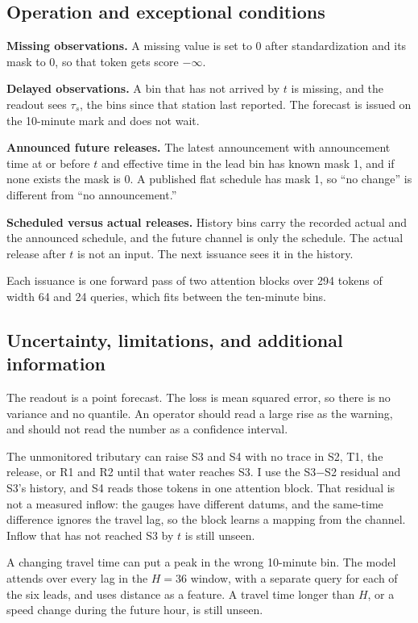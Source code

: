 \documentclass[11pt,a4paper]{article}
\begin{document}
\subsection{Operation and exceptional conditions}

\textbf{Missing observations.} A missing value is set to 0 after standardization and its mask to 0, so that token gets score \(-\infty\).

\textbf{Delayed observations.} A bin that has not arrived by \(t\) is missing, and the readout sees \(\tau_s\), the bins since that station last reported. The forecast is issued on the 10-minute mark and does not wait.

\textbf{Announced future releases.} The latest announcement with announcement time at or before \(t\) and effective time in the lead bin has known mask 1, and if none exists the mask is 0. A published flat schedule has mask 1, so ``no change'' is different from ``no announcement.''

\textbf{Scheduled versus actual releases.} History bins carry the recorded actual and the announced schedule, and the future channel is only the schedule. The actual release after \(t\) is not an input. The next issuance sees it in the history.

Each issuance is one forward pass of two attention blocks over 294 tokens of width 64 and 24 queries, which fits between the ten-minute bins.

\subsection{Uncertainty, limitations, and additional information}

The readout is a point forecast. The loss is mean squared error, so there is no variance and no quantile. An operator should read a large rise as the warning, and should not read the number as a confidence interval.

The unmonitored tributary can raise S3 and S4 with no trace in S2, T1, the release, or R1 and R2 until that water reaches S3. I use the S3$-$S2 residual and S3's history, and S4 reads those tokens in one attention block. That residual is not a measured inflow: the gauges have different datums, and the same-time difference ignores the travel lag, so the block learns a mapping from the channel. Inflow that has not reached S3 by \(t\) is still unseen.

A changing travel time can put a peak in the wrong 10-minute bin. The model attends over every lag in the \(H=36\) window, with a separate query for each of the six leads, and uses distance as a feature. A travel time longer than \(H\), or a speed change during the future hour, is still unseen.
\end{document}
